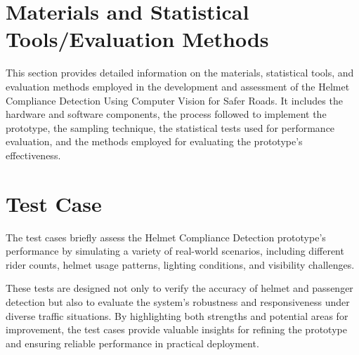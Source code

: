 \begin{refsection}
\section*{Materials and Statistical Tools/Evaluation Methods}


This section provides detailed information on the materials, statistical tools, and evaluation methods employed in the development and assessment of the Helmet Compliance Detection Using Computer Vision for Safer Roads. It includes the hardware and software components, the process followed to implement the prototype, the sampling technique, the statistical tests used for performance evaluation, and the methods employed for evaluating the prototype's effectiveness.


\section*{Test Case}


The test cases briefly assess the Helmet Compliance Detection prototype’s performance by simulating a variety of real-world scenarios, including different rider counts, helmet usage patterns, lighting conditions, and visibility challenges.


These tests are designed not only to verify the accuracy of helmet and passenger detection but also to evaluate the system’s robustness and responsiveness under diverse traffic situations. By highlighting both strengths and potential areas for improvement, the test cases provide valuable insights for refining the prototype and ensuring reliable performance in practical deployment.



\end{refsection}
